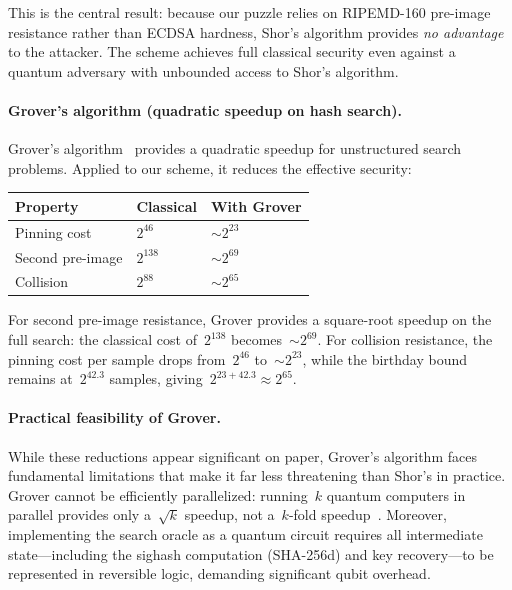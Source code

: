 \documentclass[11pt, a4paper]{article}
\begin{document}
\noindent This is the central result: because our puzzle relies on RIPEMD-160 pre-image resistance rather than ECDSA hardness, Shor's algorithm provides \emph{no advantage} to the attacker. The scheme achieves full classical security even against a quantum adversary with unbounded access to Shor's algorithm.

\paragraph{Grover's algorithm (quadratic speedup on hash search).}
Grover's algorithm~\cite{grover1996} provides a quadratic speedup for unstructured search problems. Applied to our scheme, it reduces the effective security:

\begin{center}
\begin{tabular}{lll}
\toprule
\textbf{Property} & \textbf{Classical} & \textbf{With Grover} \\
\midrule
Pinning cost & $2^{46}$ & ${\sim}2^{23}$ \\
Second pre-image & $2^{138}$ & ${\sim}2^{69}$ \\
Collision & $2^{88}$ & ${\sim}2^{65}$ \\
\bottomrule
\end{tabular}
\end{center}

\noindent For second pre-image resistance, Grover provides a square-root speedup on the full search: the classical cost of~$2^{138}$ becomes~${\sim}2^{69}$. For collision resistance, the pinning cost per sample drops from~$2^{46}$ to~${\sim}2^{23}$, while the birthday bound remains at~$2^{42.3}$ samples, giving~$2^{23 + 42.3} \approx 2^{65}$.

\paragraph{Practical feasibility of Grover.}
While these reductions appear significant on paper, Grover's algorithm faces fundamental limitations that make it far less threatening than Shor's in practice. Grover cannot be efficiently parallelized: running~$k$ quantum computers in parallel provides only a~$\sqrt{k}$ speedup, not a~$k$-fold speedup~\cite{grover1996}. Moreover, implementing the search oracle as a quantum circuit requires all intermediate state---including the sighash computation (SHA-256d) and key recovery---to be represented in reversible logic, demanding significant qubit overhead.
\end{document}

